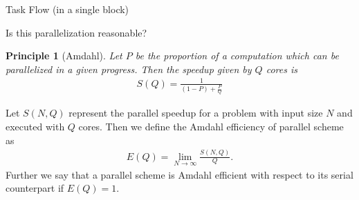 \documentclass[pdf]{beamer}
\newtheorem{principle}{Principle}
\newcommand{\lra}{\longrightarrow}
\begin{document}
\begin{frame}{Task Flow (in a single block)}
\resizebox{200pt}{!}{

}
\end{frame}
\begin{frame}{Is this parallelization reasonable?}
\begin{principle}[Amdahl]
Let $ P $ be the proportion of a computation which can be parallelized in a given progress. Then the speedup given by
$ Q $ cores is
\begin{align*}
	S(Q) = \frac{1}{(1-P)+\frac{P}{Q}}
\end{align*}

\end{principle}

\begin{definition}
\label{def:amdahl_efficient}
    Let $ S(N,Q) $ represent the parallel speedup for a problem with input size $ N $ and executed with $ Q $ cores.
    Then we define the Amdahl efficiency of parallel scheme as 
    \begin{align*}
        E(Q) = \lim_{N \lra \infty} \frac{S(N, Q)}{Q}.
    \end{align*}
    Further we say that a parallel scheme is Amdahl efficient with respect to its serial counterpart if $ E(Q) = 1 $.
\end{definition}
\end{frame}
\end{document}

